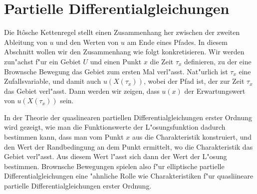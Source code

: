 %
%
\section{Partielle Differentialgleichungen\label{section:pdgl}}
Die It\^osche Kettenregel stellt einen Zusammenhang her zwischen der zweiten
Ableitung von $u$ und den Werten von $u$ am Ende eines Pfades.
In diesem Abschnitt wollen wir den Zusammenhang wie folgt konkretisieren.
Wir werden zun"achst f"ur ein Gebiet $U$ und einen Punkt $x$ die
Zeit $\tau_x$ definieren, zu der eine Brownsche Bewegung das Gebiet zum
ersten Mal verl"asst.
Nat"urlich ist $\tau_x$ eine Zufallsvariable, und damit auch $u(X(\tau_x))$,
wobei der Pfad ist, der zur Zeit $\tau_x$ das Gebiet verl"asst.
Dann werden wir zeigen, dass $u(x)$ der Erwartungswert von $u(X(\tau_x))$
sein.

In der Theorie der quaslinearen partiellen Differentialgleichungen erster
Ordnung wird gezeigt, wie man die Funktionswerte der L"osungsfunktion
dadurch bestimmen kann, dass man vom Punkt $x$ aus die Charakteristik 
konstruiert, und den Wert der Randbedingung an dem Punkt ermittelt,
wo die Charakteristik das Gebiet verl"asst.
Aus diesem Wert l"asst sich dann der Wert der L"osung bestimmen.
Brownsche Bewegungen spielen also f"ur elliptische partielle
Differentialgleichungen eine "ahnliche Rolle wie Charakteristiken f"ur
quasliineare partielle Differentialgleichungen erster Ordnung.

